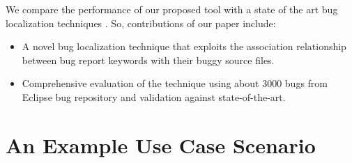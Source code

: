\documentclass[conference]{IEEEtran}
\begin{document}
We compare the performance of our proposed tool with a state of the art bug localization techniques . So, contributions of our paper include:
\begin{itemize}
 \item A novel bug localization technique that exploits the association relationship between bug report keywords with their buggy source files.
 \item Comprehensive evaluation of the technique using about 3000 bugs from Eclipse bug repository and validation against state-of-the-art.
\end{itemize}


\section{An Example Use Case Scenario}\label{sec:usecase}
\end{document}
